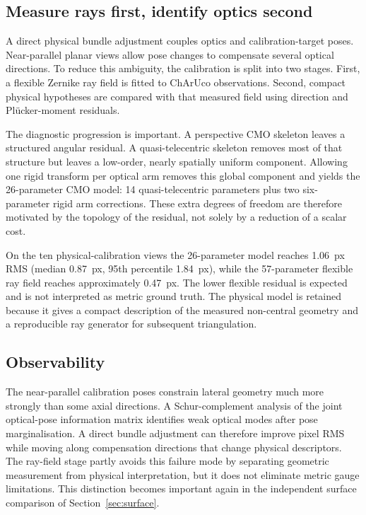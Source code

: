 \documentclass[11pt]{article}
\begin{document}
\subsection{Measure rays first, identify optics second}
A direct physical bundle adjustment couples optics and calibration-target poses. Near-parallel planar views allow pose changes to compensate several optical directions. To reduce this ambiguity, the calibration is split into two stages. First, a flexible Zernike ray field is fitted to ChArUco observations. Second, compact physical hypotheses are compared with that measured field using direction and Pl\"ucker-moment residuals.

The diagnostic progression is important. A perspective CMO skeleton leaves a structured angular residual. A quasi-telecentric skeleton removes most of that structure but leaves a low-order, nearly spatially uniform component. Allowing one rigid transform per optical arm removes this global component and yields the 26-parameter CMO model: 14 quasi-telecentric parameters plus two six-parameter rigid arm corrections. These extra degrees of freedom are therefore motivated by the topology of the residual, not solely by a reduction of a scalar cost.

On the ten physical-calibration views the 26-parameter model reaches \SI{1.06}{px} RMS (median \SI{0.87}{px}, 95th percentile \SI{1.84}{px}), while the 57-parameter flexible ray field reaches approximately \SI{0.47}{px}. The lower flexible residual is expected and is not interpreted as metric ground truth. The physical model is retained because it gives a compact description of the measured non-central geometry and a reproducible ray generator for subsequent triangulation.

\subsection{Observability}
The near-parallel calibration poses constrain lateral geometry much more strongly than some axial directions. A Schur-complement analysis of the joint optical-pose information matrix identifies weak optical modes after pose marginalisation. A direct bundle adjustment can therefore improve pixel RMS while moving along compensation directions that change physical descriptors. The ray-field stage partly avoids this failure mode by separating geometric measurement from physical interpretation, but it does not eliminate metric gauge limitations. This distinction becomes important again in the independent surface comparison of Section~\ref{sec:surface}.
\end{document}
